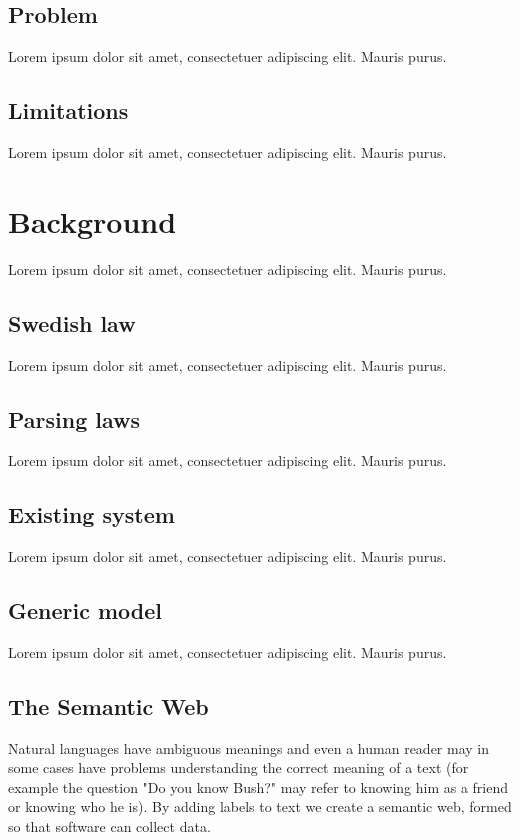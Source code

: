 \documentclass[a4paper,11pt]{kth-mag}
\begin{document}
\section{Problem}
Lorem ipsum dolor sit amet, consectetuer adipiscing elit. Mauris
purus. 

\section{Limitations}
Lorem ipsum dolor sit amet, consectetuer adipiscing elit. Mauris
purus. 

\chapter{Background}

Lorem ipsum dolor sit amet, consectetuer adipiscing elit. Mauris
purus. 

\section{Swedish law}
Lorem ipsum dolor sit amet, consectetuer adipiscing elit. Mauris
purus. 

\section{Parsing laws}
Lorem ipsum dolor sit amet, consectetuer adipiscing elit. Mauris
purus. 

\section{Existing system}
Lorem ipsum dolor sit amet, consectetuer adipiscing elit. Mauris
purus. 

\section{Generic model}
Lorem ipsum dolor sit amet, consectetuer adipiscing elit. Mauris
purus. 

\section{The Semantic Web} Natural languages have ambiguous meanings and even
a human reader may in some cases have problems understanding the correct
meaning of a text (for example the question "Do you know Bush?" may refer to
knowing him as a friend or knowing who he is). By adding labels to text we
create a semantic web, formed so that software can collect data.
\end{document}
